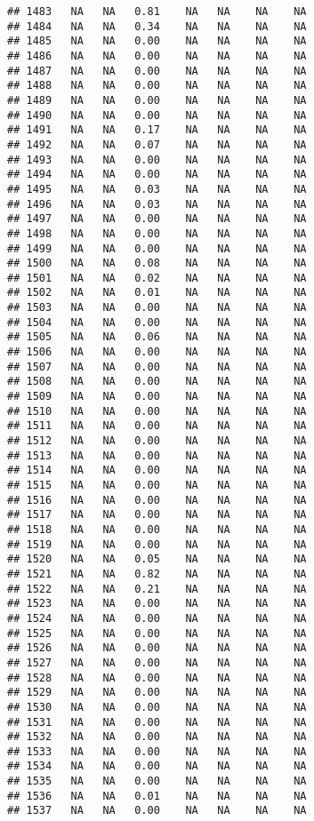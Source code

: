 \documentclass{article}\usepackage{graphicx, color}
\makeatletter
\newenvironment{kframe}{%
 \def\at@end@of@kframe{}%
 \ifinner\ifhmode%
  \def\at@end@of@kframe{\end{minipage}}%
  \begin{minipage}{\columnwidth}%
 \fi\fi%
 \def\FrameCommand##1{\hskip\@totalleftmargin \hskip-\fboxsep
 \colorbox{shadecolor}{##1}\hskip-\fboxsep
     \hskip-\linewidth \hskip-\@totalleftmargin \hskip\columnwidth}%
 \MakeFramed {\advance\hsize-\width
   \@totalleftmargin\z@ \linewidth\hsize
   \@setminipage}}%
 {\par\unskip\endMakeFramed%
 \at@end@of@kframe}
\newenvironment{knitrout}{}{} %
\makeatother
\begin{document}
\begin{knitrout}
\begin{kframe}
\begin{verbatim}
## 1483   NA   NA   0.81    NA   NA    NA    NA
## 1484   NA   NA   0.34    NA   NA    NA    NA
## 1485   NA   NA   0.00    NA   NA    NA    NA
## 1486   NA   NA   0.00    NA   NA    NA    NA
## 1487   NA   NA   0.00    NA   NA    NA    NA
## 1488   NA   NA   0.00    NA   NA    NA    NA
## 1489   NA   NA   0.00    NA   NA    NA    NA
## 1490   NA   NA   0.00    NA   NA    NA    NA
## 1491   NA   NA   0.17    NA   NA    NA    NA
## 1492   NA   NA   0.07    NA   NA    NA    NA
## 1493   NA   NA   0.00    NA   NA    NA    NA
## 1494   NA   NA   0.00    NA   NA    NA    NA
## 1495   NA   NA   0.03    NA   NA    NA    NA
## 1496   NA   NA   0.03    NA   NA    NA    NA
## 1497   NA   NA   0.00    NA   NA    NA    NA
## 1498   NA   NA   0.00    NA   NA    NA    NA
## 1499   NA   NA   0.00    NA   NA    NA    NA
## 1500   NA   NA   0.08    NA   NA    NA    NA
## 1501   NA   NA   0.02    NA   NA    NA    NA
## 1502   NA   NA   0.01    NA   NA    NA    NA
## 1503   NA   NA   0.00    NA   NA    NA    NA
## 1504   NA   NA   0.00    NA   NA    NA    NA
## 1505   NA   NA   0.06    NA   NA    NA    NA
## 1506   NA   NA   0.00    NA   NA    NA    NA
## 1507   NA   NA   0.00    NA   NA    NA    NA
## 1508   NA   NA   0.00    NA   NA    NA    NA
## 1509   NA   NA   0.00    NA   NA    NA    NA
## 1510   NA   NA   0.00    NA   NA    NA    NA
## 1511   NA   NA   0.00    NA   NA    NA    NA
## 1512   NA   NA   0.00    NA   NA    NA    NA
## 1513   NA   NA   0.00    NA   NA    NA    NA
## 1514   NA   NA   0.00    NA   NA    NA    NA
## 1515   NA   NA   0.00    NA   NA    NA    NA
## 1516   NA   NA   0.00    NA   NA    NA    NA
## 1517   NA   NA   0.00    NA   NA    NA    NA
## 1518   NA   NA   0.00    NA   NA    NA    NA
## 1519   NA   NA   0.00    NA   NA    NA    NA
## 1520   NA   NA   0.05    NA   NA    NA    NA
## 1521   NA   NA   0.82    NA   NA    NA    NA
## 1522   NA   NA   0.21    NA   NA    NA    NA
## 1523   NA   NA   0.00    NA   NA    NA    NA
## 1524   NA   NA   0.00    NA   NA    NA    NA
## 1525   NA   NA   0.00    NA   NA    NA    NA
## 1526   NA   NA   0.00    NA   NA    NA    NA
## 1527   NA   NA   0.00    NA   NA    NA    NA
## 1528   NA   NA   0.00    NA   NA    NA    NA
## 1529   NA   NA   0.00    NA   NA    NA    NA
## 1530   NA   NA   0.00    NA   NA    NA    NA
## 1531   NA   NA   0.00    NA   NA    NA    NA
## 1532   NA   NA   0.00    NA   NA    NA    NA
## 1533   NA   NA   0.00    NA   NA    NA    NA
## 1534   NA   NA   0.00    NA   NA    NA    NA
## 1535   NA   NA   0.00    NA   NA    NA    NA
## 1536   NA   NA   0.01    NA   NA    NA    NA
## 1537   NA   NA   0.00    NA   NA    NA    NA

\end{verbatim}
\end{kframe}
\end{knitrout}
\end{document}
